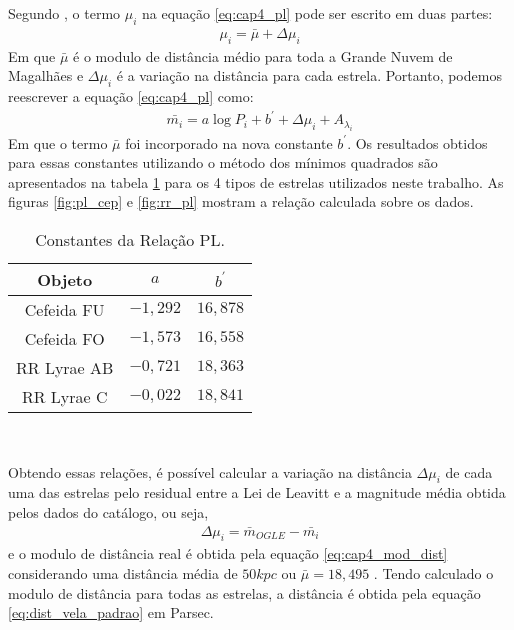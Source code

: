 Segundo \citet{Nikolaev2004}, o termo $\mu_i$ na equação \ref{eq:cap4_pl} pode ser escrito em duas partes:
\begin{align}
\mu_i = \bar{\mu} + \Delta \mu_i \label{eq:cap4_mod_dist}
\end{align}
Em que $\bar{\mu}$ é o modulo de distância médio para toda a Grande Nuvem de Magalhães e $\Delta \mu_i$ é a variação na distância para cada estrela. Portanto, podemos reescrever a equação \ref{eq:cap4_pl} como:
\begin{align}
\bar{m_i} = a \log P_i + b^\prime + \Delta \mu_i + A_{\lambda_i}
\end{align}
Em que o termo $\bar{\mu}$ foi incorporado na nova constante $b^\prime$.
Os resultados obtidos para essas constantes utilizando o método dos mínimos quadrados são apresentados na tabela \ref{tab:pl_relacao} para os 4 tipos de estrelas utilizados neste trabalho. As figuras \ref{fig:pl_cep} e \ref{fig:rr_pl} mostram a relação calculada sobre os dados.

\begin{table}[ht]
\begin{center}
\caption{Constantes da Relação PL.}
\begin{tabular}{c|c|c}
\toprule%
Objeto & $a$ & $b^\prime$ \\
\midrule%
Cefeida FU & $-1,292$ & $16,878$ \\
Cefeida FO & $-1,573$  & $16,558$ \\
RR Lyrae AB & $-0,721$ & $18,363$\\
RR Lyrae C & $-0,022$ & $18,841$\\
\bottomrule%
\end{tabular} \\
\label{tab:pl_relacao}
\end{center}
\end{table}



Obtendo essas relações, é possível calcular a variação na distância $\Delta \mu_i$ de cada uma das estrelas pelo residual entre a Lei de Leavitt e a magnitude média obtida pelos dados do catálogo, ou seja,
\begin{align}
\Delta \mu_i = \bar{m}_{OGLE} - \bar{m_i}
\end{align}
e o modulo de distância real é obtida pela equação \ref{eq:cap4_mod_dist} considerando uma distância média de $50\si{kpc}$ ou $\bar{\mu} = 18,495$ \citep{Pejcha2009}. Tendo calculado o modulo de distância para todas as estrelas, a distância é obtida pela equação \ref{eq:dist_vela_padrao} em Parsec.


